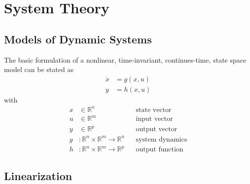 \section{System Theory}

\subsection{Models of Dynamic Systems}

The basic formulation of a nonlinear, time-invariant, continues-time, state space model can be stated as
\begin{align*}
    \dot{x} & = g(x,u) \\
    y       & = h(x,u)
\end{align*}
with
\begin{align*}
    x & \in \mathbb{R}^n                                    &  & \text{state vector}    \\
    u & \in \mathbb{R}^m                                    &  & \text{input vector}    \\
    y & \in \mathbb{R}^p                                    &  & \text{output vector}   \\
    g & : \mathbb{R}^n \times \mathbb{R}^m \to \mathbb{R}^n &  & \text{system dynamics} \\
    h & : \mathbb{R}^n \times \mathbb{R}^m \to \mathbb{R}^p &  & \text{output function}
\end{align*}


\subsection{Linearization}

